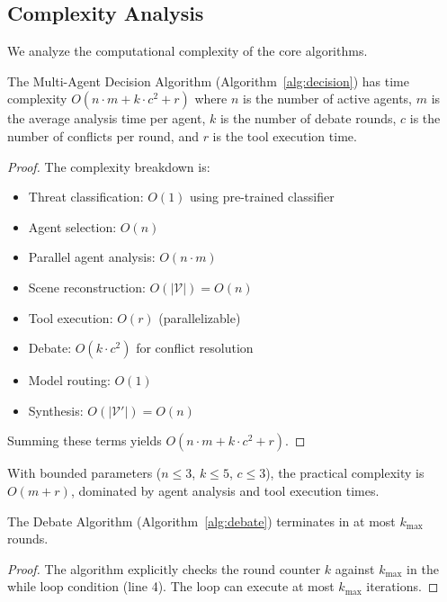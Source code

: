 \subsection{Complexity Analysis}
\label{subsec:complexity}

We analyze the computational complexity of the core algorithms.

\begin{theorem}
\label{thm:complexity}
The Multi-Agent Decision Algorithm (Algorithm~\ref{alg:decision}) has time complexity $O(n \cdot m + k \cdot c^2 + r)$ where $n$ is the number of active agents, $m$ is the average analysis time per agent, $k$ is the number of debate rounds, $c$ is the number of conflicts per round, and $r$ is the tool execution time.
\end{theorem}

\begin{proof}
The complexity breakdown is:
\begin{itemize}
    \item Threat classification: $O(1)$ using pre-trained classifier
    \item Agent selection: $O(n)$
    \item Parallel agent analysis: $O(n \cdot m)$
    \item Scene reconstruction: $O(|\mathcal{V}|) = O(n)$
    \item Tool execution: $O(r)$ (parallelizable)
    \item Debate: $O(k \cdot c^2)$ for conflict resolution
    \item Model routing: $O(1)$
    \item Synthesis: $O(|\mathcal{V}'|) = O(n)$
\end{itemize}
Summing these terms yields $O(n \cdot m + k \cdot c^2 + r)$.
\end{proof}

\begin{corollary}
\label{cor:practical}
With bounded parameters ($n \leq 3$, $k \leq 5$, $c \leq 3$), the practical complexity is $O(m + r)$, dominated by agent analysis and tool execution times.
\end{corollary}

\begin{theorem}
\label{thm:convergence}
The Debate Algorithm (Algorithm~\ref{alg:debate}) terminates in at most $k_{\max}$ rounds.
\end{theorem}

\begin{proof}
The algorithm explicitly checks the round counter $k$ against $k_{\max}$ in the while loop condition (line 4). The loop can execute at most $k_{\max}$ iterations.
\end{proof}
